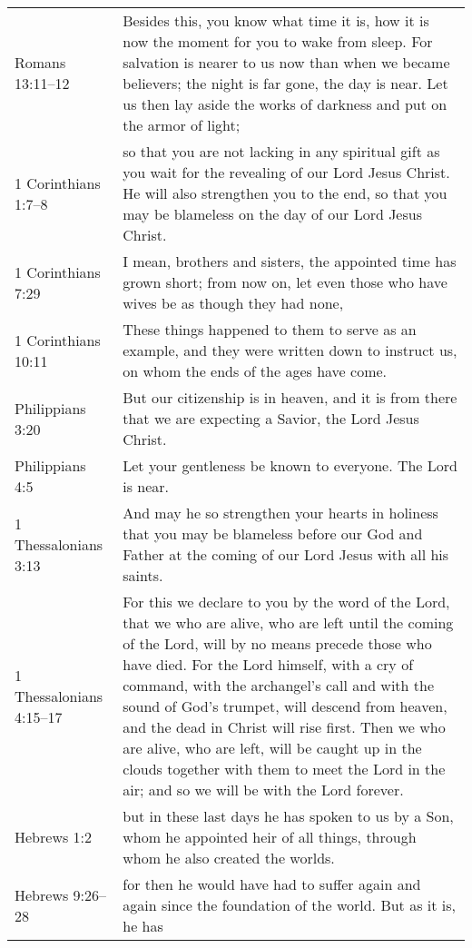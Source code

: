\begin{table}
    \footnotesize
    \begin{center}
        \begin{tabulary}{\linewidth}{lL}
            \toprule
Romans 13:11--12 & Besides 
this, you know what time it is, how it is now the moment for you to wake from 
sleep. For salvation is nearer to us now than when we became believers; the 
night is far gone, the day is near. Let us then lay aside the works of darkness 
and put on the armor of light; \\
1 Corinthians 1:7--8 & so that you are not lacking 
in any spiritual gift as you wait for the revealing of our Lord Jesus Christ. 
He will also strengthen you to the end, so that you may be blameless on the 
day of our Lord Jesus Christ. \\
1 Corinthians 7:29 & I mean, brothers and sisters, 
the appointed time has grown short; from now on, let even those who have wives 
be as though they had none, \\
1 Corinthians 10:11 & These things happened to them 
to serve as an example, and they were written down to instruct us, on whom the 
ends of the ages have come. \\
Philippians 3:20 & But our citizenship is in heaven, 
and it is from there that we are expecting a Savior, the Lord Jesus Christ. \\
Philippians 4:5 & Let your gentleness be known to everyone. The Lord is 
near. \\
1 Thessalonians 3:13 &
And may he so strengthen your hearts in holiness that you may be blameless 
before our God and Father at the coming of our Lord Jesus with all his saints. \\
1 Thessalonians 4:15--17 & For this we declare to you by the word of the 
Lord, that we who are 
alive, who are left until the coming of the Lord, will by no means precede 
those who have died. For the Lord himself, with a cry of command, with 
the archangel's call and with the sound of God's trumpet, will descend from 
heaven, and the dead in Christ will rise first. Then we who are alive, who are 
left, will be caught up in the clouds together with them to meet the Lord in 
the air; and so we will be with the Lord forever. \\
Hebrews 1:2 & but in these 
last days he has spoken to us by a Son, whom he appointed heir of all things, 
through whom he also created the worlds. \\
Hebrews 9:26--28 & for then he would have had to 
suffer again and again since the foundation of the world. But as it is, he has 

\end{tabulary}
\end{center}
\end{table}

